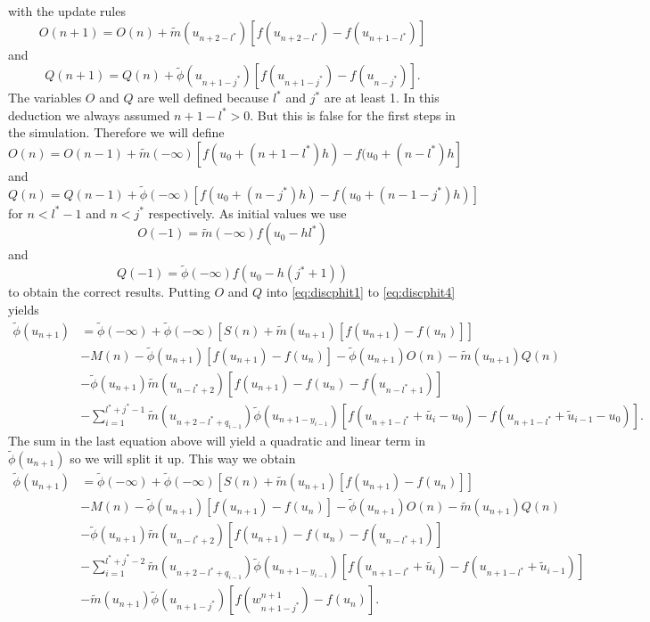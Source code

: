 \documentclass[12pt,a4paper,twoside, open=right]{scrreprt}
\theoremstyle{definition}
\theoremstyle{plain}
\begin{document}
with the update rules
\begin{equation}
O(n+1) = O(n)+\tilde{m}(u_{n+2-l^*})[f(u_{n+2-l^*})-f(u_{n+1-l^*})]
\end{equation}
and 
\begin{equation}
Q(n+1) = Q(n) + \tilde\phi(u_{n+1-j^*})[f(u_{n+1-j^*})-f(u_{n-j^*})].
\end{equation}
The variables $O$ and $Q$ are well defined because $l^*$ and $j^*$ are at least 1. In this deduction we always assumed $n+1-l^*>0$. But this is false for the first steps in the simulation. Therefore we will define
\begin{equation}
    O(n)= O(n-1)+\tilde{m}(-\infty)[f(u_0+(n+1-l^*)h)-f(u_0+(n-l^*)h]
\end{equation}
and 
\begin{equation}
Q(n)= Q(n-1)+\tilde{\phi}(-\infty)[f(u_0+(n-j^*)h)-f(u_0+(n-1-j^*)h)]
\end{equation}
for $n<l^*-1$ and $n<j^*$ respectively. As initial values we use 
\begin{equation}
    O(-1) = \tilde{m}(-\infty)f(u_0-hl^*)
\end{equation}
and
\begin{equation}
    Q(-1) = \tilde{\phi}(-\infty)f(u_0-h(j^*+1))
\end{equation}
to obtain the correct results.
Putting $O$ and $Q$ into \eqref{eq:discphit1} to \eqref{eq:discphit4} yields
\begin{align}
    \tilde\phi(u_{n+1})&=\tilde\phi(-\infty) +\tilde\phi(-\infty)[S(n)+\tilde{m}(u_{n+1})[f(u_{n+1})-f(u_n)]]\\&-M(n) -\tilde\phi(u_{n+1})[f(u_{n+1})-f(u_{n})] -\tilde{\phi}(u_{n+1})O(n)-\tilde{m}(u_{n+1})Q(n)\\&-\tilde\phi(u_{n+1})\tilde{m}(u_{n-l^*+2})[f(u_{n+1})-f(u_n)-f(u_{n-l^*+1})] \\&-\sum_{i=1}^{l^*+j^*-1}\tilde{m}(u_{n+2-l^*+q_{i-1}})\tilde{\phi}(u_{n+1-y_{i-1}})[f(u_{n+1-l^*}+\tilde{u_i}-u_0)-f(u_{n+1-l^*}+\tilde{u}_{i-1}-u_0)].
\end{align}
The sum in the last equation above will yield a quadratic and linear term in $\tilde{\phi}(u_{n+1})$ so we will split it up. This way we obtain
\begin{align}
   \tilde\phi(u_{n+1})&=\tilde\phi(-\infty) +\tilde\phi(-\infty)[S(n)+\tilde{m}(u_{n+1})[f(u_{n+1})-f(u_n)]]\\&-M(n) -\tilde\phi(u_{n+1})[f(u_{n+1})-f(u_{n})] -\tilde{\phi}(u_{n+1})O(n)-\tilde{m}(u_{n+1})Q(n)\\&-\tilde\phi(u_{n+1})\tilde{m}(u_{n-l^*+2})[f(u_{n+1})-f(u_n)-f(u_{n-l^*+1})] \\&-\sum_{i=1}^{l^*+j^*-2}\tilde{m}(u_{n+2-l^*+q_{i-1}})\tilde{\phi}(u_{n+1-y_{i-1}})[f(u_{n+1-l^*}+\tilde{u_i})-f(u_{n+1-l^*}+\tilde{u}_{i-1})]\\&-\tilde{m}(u_{n+1})\tilde{\phi}(u_{n+1-j^*})[f(w^{n+1}_{n+1-j^*})-f(u_n)].
\end{align}
\end{document}
